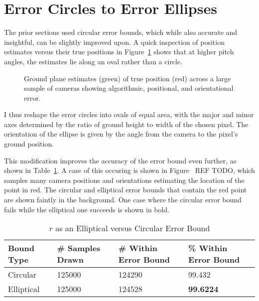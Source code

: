 \documentclass[a4paper,12pt,twoside,openright]{report}
\begin{document}
\section{Error Circles to Error Ellipses}

The prior sections used circular error bounds, which while also accurate and insightful,
can be slightly improved upon. A quick inspection of position estimates versus their true
positions in Figure~\ref{fig:camera:distributions} shows that at higher pitch angles, the estimates lie 
along an oval rather than a circle.

\begin{figure}[htb]
    \begin{center}
        
    \end{center}
    \caption[Distribution of Estimates]{Ground plane estimates (green) of true position (red) across a large sample of cameras showing algorithmic, positional, and orientational error.}
    \label{fig:camera:distributions}
\end{figure}

I thus reshape the error circles into ovals of equal area, with the major
and minor axes determined by the ratio of ground height to width of the chosen pixel.
The orientation of the ellipse is given by the angle from the camera to the pixel's
ground position.

This modification improves the accuracy of the error bound even further, as shown
in Table~\ref{tab:camera:ellipse vs circle}. A case of this occuring is shown
in Figure~ REF TODO, which samples many camera positions and orientations
estimating the location of the point in red. The circular and elliptical 
error bounds that contain the red point are shown faintly in the background. One
case where the circular error bound fails while the elliptical one succeeds
is shown in bold.

\begin{table}[htb]
    \centering
    \caption[Elliptical versus Circular Error Bound]{$r$ as an Elliptical versus Circular Error Bound}
    \label{tab:camera:ellipse vs circle}
    \begin{tabular}{@{}llll@{}}
        \toprule
        Bound Type    & \# Samples Drawn        & \# Within Error Bound   & \% Within Error Bound \\ \midrule
        Circular      &   125000              & 124290                  & 99.432  \\
        Elliptical    &   125000              & 124528                  & \textbf{99.6224}
    \end{tabular}
\end{table}
\end{document}
